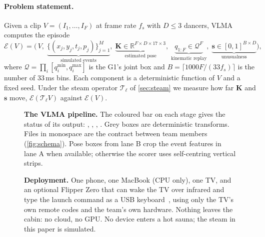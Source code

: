 \documentclass[10pt]{article}
\newcommand{\vlma}{\textsc{VLMA}}
\newcommand{\R}{\mathbb{R}}
\begin{document}
\paragraph{Problem statement.} Given a clip $V=(I_1,\dots,I_F)$ at frame rate $f_s$ with $D\le3$ dancers, \vlma{} computes the episode
\begin{equation}
  \mathcal{E}(V) = \Big(\,V,\; \underbrace{\{(x_j,y_j,t_j,p_j)\}_{j=1}^{M}}_{\text{simulated events}},\; \underbrace{\mathbf{K}\in\R^{F\times D\times17\times3}}_{\text{estimated pose}},\; \underbrace{q_{1:F}\in\mathcal{Q}^{F}}_{\text{kinematic replay}},\; \underbrace{\mathbf{s}\in[0,1]^{B\times D}}_{\text{unusualness}}\Big),
  \label{eq:episode}
\end{equation}
where $\mathcal{Q}=\prod_i[q_i^{\min},q_i^{\max}]$ is the G1's joint box and $B=\lceil 1000F/(33f_s)\rceil$ is the number of 33\,ms bins. Each component is a deterministic function of $V$ and a fixed seed. Under the steam operator $\mathcal{T}_\ell$ of \cref{sec:steam} we measure how far $\mathbf{K}$ and $\mathbf{s}$ move, $\mathcal{E}(\mathcal{T}_\ell V)$ against $\mathcal{E}(V)$.

\begin{figure}[tbp]
  \centering
  \resizebox{\linewidth}{!}{}
  \caption[The VLMA pipeline]{\textbf{The \vlma{} pipeline.} The coloured bar on each stage gives the status of its output: , , , . Grey boxes are deterministic transforms. Files in monospace are the contract between team members (\cref{fig:schema}). Pose boxes from lane B crop the event features in lane A when available; otherwise the scorer uses self-centring vertical strips.}
  \label{fig:pipeline}
\end{figure}

\begin{figure}[t]
  \centering
  \resizebox{\linewidth}{!}{}
  \caption[Deployment: phone, laptop, TV, optional Flipper Zero]{\textbf{Deployment.} One phone, one MacBook (CPU only), one TV, and an optional Flipper Zero that can wake the TV over infrared and type the launch command as a USB keyboard~\cite{flipperdocs}, using only the TV's own remote codes and the team's own hardware. Nothing leaves the cabin: no cloud, no GPU. No device enters a hot sauna; the steam in this paper is simulated.}
  \label{fig:hardware}
\end{figure}
\end{document}
